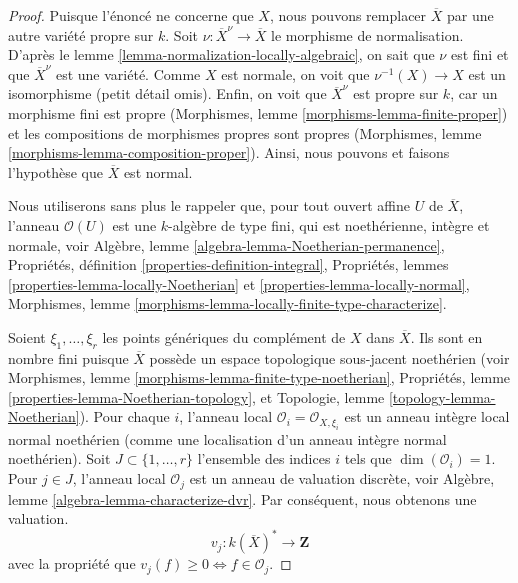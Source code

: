 \begin{proof}
 Puisque l'énoncé ne concerne que $X$, nous pouvons remplacer $\overline{X}$
 par une autre variété propre sur $k$. Soit $\nu : \overline{X}^\nu \to
\overline{X}$ le morphisme de normalisation. D'après le
lemme \ref{lemma-normalization-locally-algebraic},
on sait que $\nu$ est fini et que $\overline{X}^\nu$ est
une variété. Comme $X$ est normale, on voit que $\nu^{-1}(X) \to X$ est
un isomorphisme (petit détail omis). Enfin, on voit que 
$\overline{X}^\nu$ est propre sur $k$, car un morphisme fini
est propre (Morphismes, lemme \ref{morphisms-lemma-finite-proper})
et les compositions de morphismes
propres sont propres (Morphismes, lemme \ref{morphisms-lemma-composition-proper}).
Ainsi, nous pouvons et faisons l'hypothèse que $\overline{X}$ est normal.

\medskip\noindent
 Nous utiliserons sans plus le rappeler que, pour tout ouvert affine $U$ de 
$\overline{X}$, l'anneau $\mathcal{O}(U)$ est une 
$k$-algèbre de type fini, qui est noethérienne, intègre et normale,
voir Algèbre, lemme \ref{algebra-lemma-Noetherian-permanence},
Propriétés, définition \ref{properties-definition-integral},
Propriétés, lemmes \ref{properties-lemma-locally-Noetherian} et 
\ref{properties-lemma-locally-normal},
Morphismes, lemme \ref{morphisms-lemma-locally-finite-type-characterize}.

\medskip\noindent
 Soient $\xi_1, \ldots, \xi_r$ les points génériques du complément de $X$
 dans $\overline{X}$. Ils sont en nombre fini puisque $\overline{X}$ possède
un espace topologique sous-jacent noethérien (voir
Morphismes, lemme \ref{morphisms-lemma-finite-type-noetherian},
Propriétés, lemme \ref{properties-lemma-Noetherian-topology},
et Topologie, lemme \ref{topology-lemma-Noetherian}).
Pour chaque $i$, l'anneau local $\mathcal{O}_i = \mathcal{O}_{X, \xi_i}$
 est un anneau intègre local normal noethérien (comme une localisation d’un
anneau intègre normal noethérien). Soit $J \subset \{1, \ldots, r\}$ l'ensemble
des indices $i$ tels que $\dim(\mathcal{O}_i) = 1$. Pour $j \in J$,
l'anneau local $\mathcal{O}_j$ est un anneau de valuation discrète,
voir Algèbre, lemme \ref{algebra-lemma-characterize-dvr}.
Par conséquent, nous obtenons une valuation. 
$$
v_j : k(\overline{X})^* \longrightarrow \mathbf{Z}
$$
 avec la propriété que $v_j(f) \geq 0 \Leftrightarrow f \in \mathcal{O}_j$.


\end{proof}
